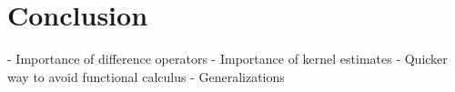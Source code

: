 \chapter{Conclusion}

- Importance of difference operators
- Importance of kernel estimates
- Quicker way to avoid functional calculus
- Generalizations
